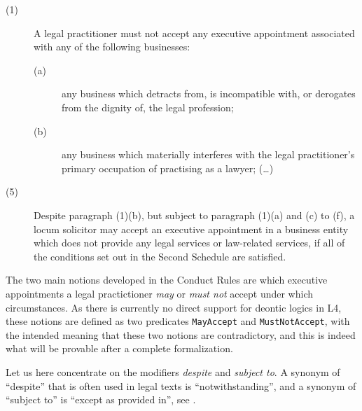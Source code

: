 \begin{description}
\item[(1)] A legal practitioner must not accept any executive appointment
  associated with any of the following businesses: 
  \begin{description}
  \item[(a)] any business which detracts from, is incompatible with, or
    derogates from the dignity of, the legal profession;
  \item[(b)] any business which materially interferes with the legal
    practitioner’s primary occupation of practising as a lawyer; (\dots)
  \end{description}
\item[(5)] Despite paragraph (1)(b), but subject to paragraph (1)(a) and (c)
  to (f), a locum solicitor may accept an executive appointment in a business
  entity which does not provide any legal services or law-related services, if
  all of the conditions set out in the Second Schedule are satisfied.
\end{description}

The two main notions developed in the Conduct Rules are which executive appointments a legal
practictioner \emph{may} or \emph{must not} accept under which
circumstances. As there is currently no direct support for deontic logics in
L4, these notions are defined as two predicates \texttt{MayAccept} and
\texttt{MustNotAccept}, with the intended meaning that these two notions are
contradictory, and this is indeed what will be provable after a complete
formalization.

Let us here concentrate on the modifiers \emph{despite} and \emph{subject
  to}. A synonym of ``despite'' that is often used in legal texts is
``notwithstanding'',  and a synonym of
``subject to'' is ``except as provided in'', see \cite{adams_contract_drafting_2004}.

